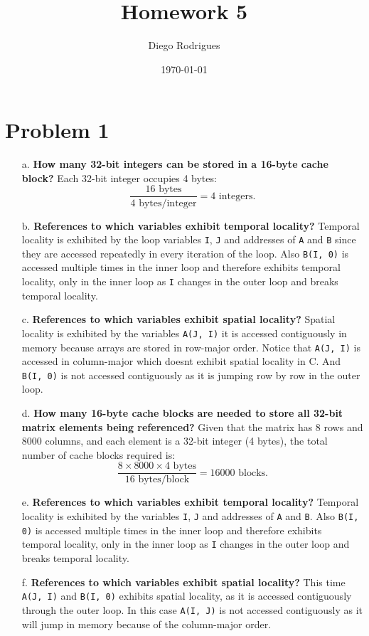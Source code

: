 \documentclass{article}
\title{Homework 5}
\author{Diego Rodrigues}
\date{\today}
\begin{document}
\maketitle

\section{Problem 1}
\begin{enumerate}
    \item[a.] \textbf{How many 32-bit integers can be stored in a 16-byte cache block?}
    Each 32-bit integer occupies 4 bytes:
    \[
    \frac{16 \text{ bytes}}{4 \text{ bytes/integer}} = 4 \text{ integers}.
    \]
    
    \item[b.] \textbf{References to which variables exhibit temporal locality?}
    Temporal locality is exhibited by the loop variables \verb|I|, \verb|J| and addresses of \verb|A| and \verb|B| since they are accessed repeatedly in every iteration of the loop. Also \verb|B(I, 0)| is accessed multiple times in the inner loop and therefore exhibits temporal locality, only in the inner loop as \verb|I| changes in the outer loop and breaks temporal locality.
    
    \item[c.] \textbf{References to which variables exhibit spatial locality?}
    Spatial locality is exhibited by the variables \verb|A(J, I)| it is accessed contiguously in memory because arrays are stored in row-major order. Notice that \verb|A(J, I)| is accessed in column-major which doesnt exhibit spatial locality in C. And \verb|B(I, 0)| is not accessed contiguously as it is jumping row by row in the outer loop.

    \item[d.] \textbf{How many 16-byte cache blocks are needed to store all 32-bit matrix elements being referenced?}
    Given that the matrix has 8 rows and 8000 columns, and each element is a 32-bit integer (4 bytes), the total number of cache blocks required is:
    \[
    \frac{8 \times 8000 \times 4 \text{ bytes}}{16 \text{ bytes/block}} = 16000 \text{ blocks}.
    \]
    
    \item[e.] \textbf{References to which variables exhibit temporal locality?}
    Temporal locality is exhibited by the variables \verb|I|, \verb|J| and addresses of \verb|A| and \verb|B|. Also \verb|B(I, 0)| is accessed multiple times in the inner loop and therefore exhibits temporal locality, only in the inner loop as \verb|I| changes in the outer loop and breaks temporal locality.
    
    \item[f.] \textbf{References to which variables exhibit spatial locality?}
    This time \verb|A(J, I)| and \verb|B(I, 0)| exhibits spatial locality, as it is accessed contiguously through the outer loop. In this case \verb|A(I, J)| is not accessed contiguously as it will jump in memory because of the column-major order.
\end{enumerate}
\end{document}
